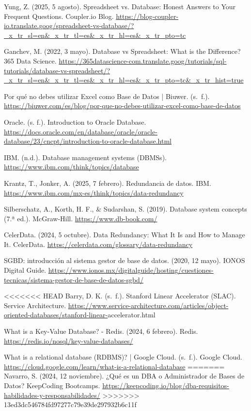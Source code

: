 \documentclass[12pt]{report}
\begin{document}
\begin{thebibliography}{99}
    Yung, Z. (2025, 5 agosto). Spreadsheet vs. Database: Honest Answers to Your Frequent Questions. Coupler.io Blog. \url{https://blog-coupler-io.translate.goog/spreadsheet-vs-database/?_x_tr_sl=en&_x_tr_tl=es&_x_tr_hl=es&_x_tr_pto=tc}

    Ganchev, M. (2022, 3 mayo). Database vs Spreadsheet: What is the Difference? 365 Data Science. \url{https://365datascience-com.translate.goog/tutorials/sql-tutorials/database-vs-spreadsheet/?_x_tr_sl=en&_x_tr_tl=es&_x_tr_hl=es&_x_tr_pto=tc&_x_tr_hist=true}

    Por qué no debes utilizar Excel como Base de Datos | Biuwer. (s. f.). \url{https://biuwer.com/es/blog/por-que-no-debes-utilizar-excel-como-base-de-datos}

    Oracle. (s. f.). Introduction to Oracle Database. \url{https://docs.oracle.com/en/database/oracle/oracle-database/23/cncpt/introduction-to-oracle-database.html}

    IBM. (n.d.). Database management systems (DBMSs). \url{https://www.ibm.com/think/topics/database}
    
    Krantz, T., Jonker, A. (2025, 7 febrero). Redundancia de datos. IBM. \url{https://www.ibm.com/mx-es/think/topics/data-redundancy}

    Silberschatz, A., Korth, H. F., \& Sudarshan, S. (2019). Database system concepts (7.ª ed.). McGraw-Hill. \url{https://www.db-book.com/}
    
    CelerData. (2024, 5 octubre). Data Redundancy: What It Is and How to Manage It. CelerData. \url{https://celerdata.com/glossary/data-redundancy}

    SGBD: introducción al sistema gestor de base de datos. (2020, 12 mayo). IONOS Digital Guide. \url{https://www.ionos.mx/digitalguide/hosting/cuestiones-tecnicas/sistema-gestor-de-base-de-datos-sgbd/}

<<<<<<< HEAD
    Barry, D. K. (s. f.). Stanford Linear Accelerator (SLAC). Service Architecture. \url{https://www.service-architecture.com/articles/object-oriented-databases/stanford-linear-}accelerator.html

    What is a Key-Value Database? - Redis. (2024, 6 febrero). Redis. \url{https://redis.io/nosql/key-value-databases/}

    What is a relational database (RDBMS)? | Google Cloud. (s. f.). Google Cloud. \url{https://cloud.google.com/learn/what-is-a-relational-database}
=======
    Navarro, S. (2024, 12 noviembre). ¿Qué es un DBA o Administrador de Bases de Datos? KeepCoding Bootcamps. \url{https://keepcoding.io/blog/dba-requisitos-habilidades-y-responsabilidades/}
>>>>>>> 13ed3dc546784fd97277c79e39de297932b6c11f
\end{thebibliography}
\end{document}
